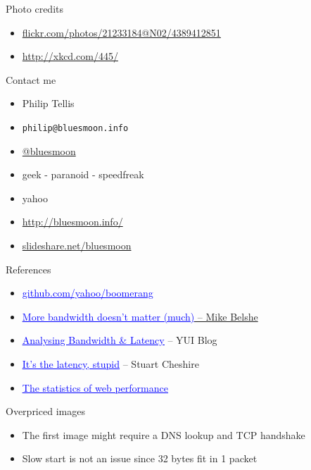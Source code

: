 \documentclass{beamer}
\begin{document}
\begin{frame}{Photo credits}
  \begin{itemize}
  \item \href{http://www.flickr.com/photos/21233184@N02/4389412851/}{flickr.com/photos/21233184@N02/4389412851}
  \item \href{http://xkcd.com/445/}{http://xkcd.com/445/}
  \end{itemize}
\end{frame}

\begin{frame}{Contact me}
  \begin{itemize}
  \item Philip Tellis
  \item \small{\texttt{philip@bluesmoon.info}}
  \item \href{http://twitter.com/bluesmoon}{@bluesmoon}
  \item geek - paranoid - speedfreak
  \item yahoo
  \item \href{http://bluesmoon.info/}{http://bluesmoon.info/}
  \item \href{http://www.slideshare.net/bluesmoon}{slideshare.net/bluesmoon}
  \end{itemize}
\end{frame}

\begin{frame}{References}
  \begin{itemize}
  \item \href{http://github.com/yahoo/boomerang/}{\textcolor{blue}{\underline{github.com/yahoo/boomerang}}}
  \item \href{http://www.belshe.com/2010/05/24/more-bandwidth-doesnt-matter-much/}{\textcolor{blue}{\underline{More bandwidth doesn't matter (much)}} -- Mike Belshe}
  \item \href{http://www.yuiblog.com/blog/2010/04/08/analyzing-bandwidth-and-latency/}{\textcolor{blue}{\underline{Analysing Bandwidth \& Latency}}} -- YUI Blog
  \item \href{http://www.stuartcheshire.org/rants/Latency.html}{\textcolor{blue}{\underline{It's the latency, stupid}}} -- Stuart Cheshire
  \item \href{http://www.slideshare.net/bluesmoon/index-3441823}{\textcolor{blue}{\underline{The statistics of web performance}}}
  \end{itemize}
\end{frame}

\begin{frame}{Overpriced images}
\label{note:oversized}
  \begin{itemize}
  \item The first image might require a DNS lookup and TCP handshake
  \item Slow start is not an issue since 32 bytes fit in 1 packet
  \end{itemize}
\end{frame}
\end{document}
